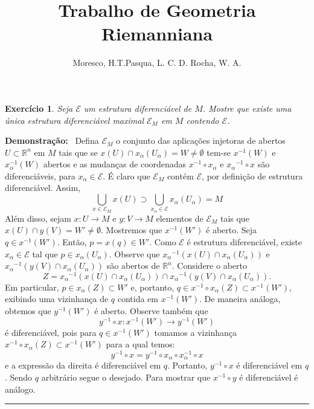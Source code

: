 \documentclass[12pt]{report}
\title{Trabalho de Geometria Riemanniana}
\author{Moresco, H.T.\quad Pasqua, L. C. D.  \quad Rocha, W. A.}
\newtheorem{exer}[theorem]{\color{red} Exercício \color{black}}
\newenvironment{dem}[1][Demonstração]{\textbf{#1:}\ }  {\hfill\rule{1ex}{1ex}}
\newcommand{\oo}{_}
\newcommand{\inv}[1]{\ensuremath{{#1}^{-1}}}
\begin{document}
\maketitle
\begin{exer}
    Seja $\mathcal{E}$ um estrutura diferenciável de $M$. 
    Mostre que existe uma única estrutura diferenciável maximal $\mathcal{E} \oo M$ em $M$ contendo $\mathcal{E}$.
\end{exer}
\begin{dem}
    Defina $\mathcal{E} \oo M$ o conjunto das aplicações injetoras de abertos $U \subset \mathbb{R}^n$ em $M$ tais que se $x(U) \cap x\oo \alpha (U \oo {\alpha} ) = W \neq \emptyset  $ tem-se $x^{-1} (W)$ e $x \oo \alpha ^{-1} (W)$ abertos e as mudanças de coordenadas $x^{-1} \circ x \oo \alpha $ e $\inv{x \oo \alpha} \circ x$ são diferenciáveis, para $x \oo \alpha \in \mathcal{E}$. 
    É claro que $\mathcal{E} \oo M$ contém $\mathcal{E}$, por definição de estrutura diferenciável. 
    Assim, 
    \[
        \bigcup \oo {x \in \mathcal{E} \oo {M} } x(U) \supset \bigcup \oo {x \oo \alpha \in \mathcal{E}} x\oo \alpha (U \oo \alpha ) = M 
    \]
    Além disso, sejam $x : U \rightarrow M$ e $y :V \rightarrow M$ elementos de $\mathcal{E} \oo M$ tais que $x(U) \cap y(V)  = W' \neq \emptyset $. 
    Mostremos que $\inv{x} (W')$ é aberto. 
    Seja $q \in \inv{x} (W')$. 
    Então, $p = x(q) \in W'$. 
    Como $\mathcal{E}$ é estrutura diferenciável, existe $ x \oo \alpha \in \mathcal{E} $ tal que $p \in x \oo \alpha (U \oo \alpha )$. 
    Observe que $\inv{x \oo \alpha} (x(U) \cap x \oo \alpha (U \oo \alpha))$ e $\inv{x \oo \alpha} (y(V) \cap x\oo \alpha (U \oo \alpha))$ são abertos de $\mathbb{R}^n$. 
    Considere o aberto
    \[
        Z = \inv{x \oo \alpha} (x(U) \cap x \oo \alpha (U \oo \alpha))\cap \inv{x \oo \alpha} (y(V) \cap x\oo \alpha (U \oo \alpha)).
    \]
    Em particular, 
    $  p \in x\oo \alpha (Z) \subset  W' $ e, portanto, $q \in \inv{x} \circ x \oo \alpha (Z) \subset \inv{x} (W')$, exibindo uma vizinhança de $q$ contida em $x^{-1} (W')$. 
    De maneira análoga, obtemos que $y^{-1} (W')$ é aberto. Observe também que 
    \[
        \inv{y} \circ x :  x^{-1}(W') \rightarrow y^{-1} (W')
    \]
    é diferenciável, pois para $q \in x^{-1}(W')$ tomamos a vizinhança $x^{-1} \circ x_{\alpha} (Z) \subset x^{-1}(W')$ para a qual temos: 
    $$
        y^{-1} \circ x = y^{-1} \circ x_{\alpha} \circ x_{\alpha}^{-1} \circ x 
    $$ 
    e a expressão da direita é diferenciável em $q$. 
    Portanto, $y^{-1} \circ x$ é diferenciável em $q$. 
    Sendo $q$ arbitrário segue o desejado. 
    Para mostrar que $x^{-1} \circ y$ é diferenciável é análogo. 
    

\end{dem}
\end{document}
